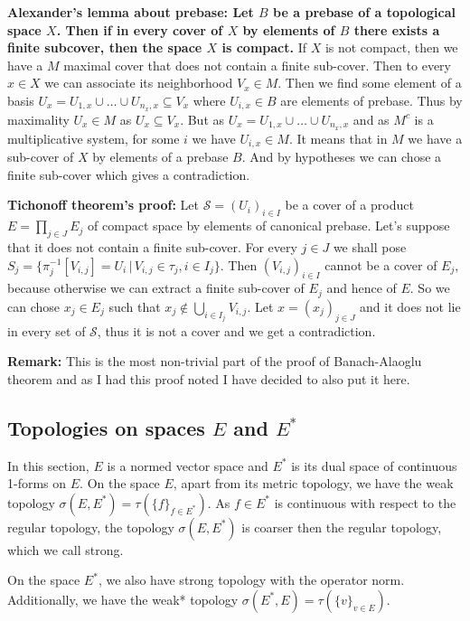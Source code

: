 \documentclass{article}
\begin{document}
\textbf{Alexander's lemma about prebase: Let $B$ be a prebase of a topological
space $X$. Then if in every cover of $X$ by elements of $B$ there exists a finite
subcover, then the space $X$ is compact.} If $X$ is not compact, then we have
a $M$ maximal cover that does not contain a finite sub-cover. Then to every
$x\in X$ we can associate its neighborhood $V_x\in M$. Then we find some
element of a basis $U_x=U_{1,x}\cup\ldots\cup U_{n_x,x}\subseteq V_x$ where
$U_{i,x}\in B$ are elements of prebase. Thus by maximality $U_x\in M$ as
$U_x\subseteq V_x$. But as $U_x=U_{1,x}\cup\ldots\cup U_{n_x,x}$ and as $M^c$
is a multiplicative system, for some $i$ we have $U_{i,x}\in M$. It means that
in $M$ we have a sub-cover of $X$ by elements of a prebase $B$. And by hypotheses
we can chose a finite sub-cover which gives a contradiction.
\vspace{1ex}

\textbf{Tichonoff theorem's proof:} Let $\mathcal{S}=(U_i)_{i\in I}$ be a cover of a
product $E=\prod_{j\in J} E_j$ of compact space by elements of canonical prebase.
Let's suppose that it does not contain a finite sub-cover. For every $j\in J$
we shall pose $S_j=\{\pi_j^{-1}[V_{i,j}]=U_i\,|\,V_{i,j}\in\tau_j,i\in I_j\}$.
Then $(V_{i,j})_{i\in I}$ cannot be a cover of $E_j$, because otherwise we can
extract a finite sub-cover of $E_j$ and hence of $E$. So we can chose $x_j\in
E_j$ such that $x_j\notin\bigcup_{i\in I_j}V_{i,j}$. Let $x=(x_j)_{j\in J}$ and
it does not lie in every set of $\mathcal{S}$, thus it is not a cover and we get
a contradiction.

\vspace{1ex}
\textbf{Remark:} This is the most non-trivial part of the proof of Banach-Alaoglu
theorem and as I had this proof noted I have decided to also put it here.

\subsection{Topologies on spaces $E$ and $E^*$}
In this section, $E$ is a normed vector space and $E^*$ is its dual space of continuous
1-forms on $E$. On the space $E$, apart from its metric topology, we have
the weak topology $\sigma(E, E^*)=\tau(\{f\}_{f\in E^*})$. As $f\in E^*$ is
continuous with respect to the regular topology, the topology $\sigma(E, E^*)$
is coarser then the regular topology, which we call strong.
\vspace{1ex}

On the space $E^*$, we also have strong topology with the operator norm.
Additionally, we have the weak* topology $\sigma(E^*, E)=\tau(\{v\}_{v\in E})$.
\end{document}
